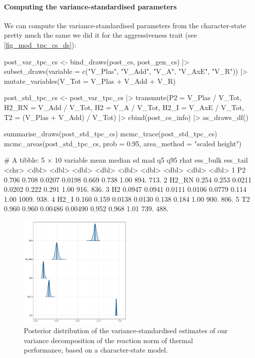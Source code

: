 \documentclass[a4paper,12pt,twoside]{article}
\begin{document}
\paragraph{Computing the variance-standardised parameters}
We can compute the variance-standardised parameters from the character-state pretty much the same we did it for the aggressiveness trait (see \autoref{fig_mod_tpc_cs_ds}):
\begin{Rinput}
post_var_tpc_cs <-
    bind_draws(post_cs, post_gen_cs) |>
    subset_draws(variable = c("V_Plas", "V_Add", "V_A", "V_AxE", "V_R")) |>
    mutate_variables(V_Tot = V_Plas + V_Add + V_R)

post_std_tpc_cs <-
    post_var_tpc_cs |>
    transmute(P2    = V_Plas / V_Tot,
              H2_RN = V_Add / V_Tot,
              H2    = V_A / V_Tot,
              H2_I  = V_AxE / V_Tot,
              T2    = (V_Plas + V_Add) / V_Tot) |>
    cbind(post_cs_info) |>
    as_draws_df()

summarise_draws(post_std_tpc_cs)
mcmc_trace(post_std_tpc_cs)
mcmc_areas(post_std_tpc_cs,
           prob = 0.95,
           area_method = "scaled height")
\end{Rinput}
\begin{Routput}
# A tibble: 5 × 10
  variable   mean median      sd     mad     q5   q95  rhat ess_bulk ess_tail
  <chr>     <dbl>  <dbl>   <dbl>   <dbl>  <dbl> <dbl> <dbl>    <dbl>    <dbl>
1 P2       0.706  0.708  0.0207  0.0198  0.669  0.738  1.00     894.     713.
2 H2_RN    0.254  0.253  0.0211  0.0202  0.222  0.291  1.00     916.     836.
3 H2       0.0947 0.0941 0.0111  0.0106  0.0779 0.114  1.00    1009.     938.
4 H2_I     0.160  0.159  0.0138  0.0130  0.138  0.184  1.00     900.     806.
5 T2       0.960  0.960  0.00486 0.00490 0.952  0.968  1.01     739.     488.\end{Routput}

\begin{figure}[h!t!]
  \includegraphics[width = 0.49\textwidth]{TPC_varstd_cs_ds.pdf}
  \caption{Posterior distribution of the variance-standardised estimates of our variance decomposition of the reaction norm of thermal performance, based on a character-state model.}
  \label{fig_tpc_cs_var_decomp_ds}
\end{figure}
\end{document}
